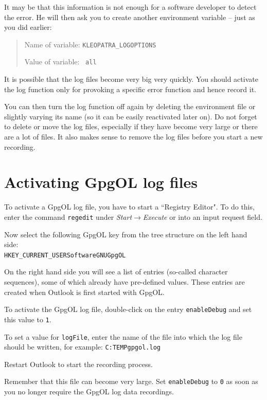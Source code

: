 \documentclass[a4paper,11pt,oneside,openright,titlepage]{scrbook}
\newcommand{\Menu}[1]{\textit{#1}}
\newcommand{\Filename}[1]{\small{\texttt{#1}}\normalsize}
\begin{document}
It may be that this information is not enough for a software developer
to detect the error. He will then ask you to create another
environment variable -- just as you did earlier:

\begin{quote}
    Name of variable: \Filename{KLEOPATRA\_LOGOPTIONS}

    Value of variable: ~\Filename{all}
\end{quote}

It is possible that the log files become very big very quickly. You
should activate the log function only for provoking a specific error
function and hence record it.

You can then turn the log function off again by deleting the
environment file or slightly varying its name (so it can be easily
reactivated later on). Do not forget to delete or move the log files,
especially if they have become very large or there are a lot of files.
It also makes sense to remove the log files before you start a new
recording.


\clearpage
\section{Activating GpgOL log files}

To activate a GpgOL log file, you have to start a ``Registry Editor".
To do this, enter the command \Filename{regedit} under
\Menu{Start$\rightarrow$Execute} or into an input request field.

Now select the following GpgOL key from the tree structure on the left
hand side:\\
\Filename{HKEY\_CURRENT\_USER\back{}Software\back{}GNU\back{}GpgOL}

On the right hand side you will see a list of entries (so-called
character sequences), some of which already have pre-defined values.
These entries are created when Outlook is first started with GpgOL.

To activate the GpgOL log file, double-click on the entry
\Filename{enableDebug} and set this value to \Filename{1}.

To set a value for \Filename{logFile}, enter the name of the file into
which the log file should be written, for example:
\Filename{C:\back{}TEMP\back{}gpgol.log}

Restart Outlook to start the recording process.

Remember that this file can become very large. Set
\Filename{enableDebug} to \Filename{0} as soon as you no longer
require the GpgOL log data recordings.
\end{document}
